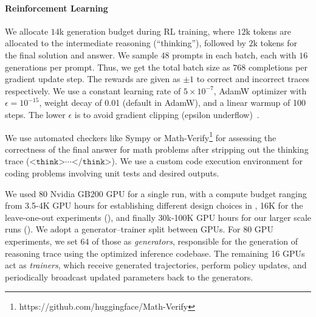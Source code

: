 \documentclass[]{fairmeta} %
\begin{document}
\paragraph{Reinforcement Learning}
We allocate $14$k generation budget during RL training, where $12\text{k}$ tokens are allocated to the intermediate reasoning (``thinking''), followed by $2\text{k}$ tokens for the final solution and answer. We sample $48$ prompts in each batch, each with $16$ generations per prompt. Thus, we get the total batch size as $768$ completions per gradient update step. The rewards are given as $\pm 1$ to correct and incorrect traces respectively. We use a constant learning rate of $5 \times 10^{-7}$, AdamW optimizer \citep{adamw} with $\epsilon = 10^{-15}$, weight decay of 0.01 (default in AdamW), and a linear warmup of 100 steps. The lower $\epsilon$ is to avoid gradient clipping (epsilon underflow)~\citep{wortsman2023stable}.

We use automated checkers like Sympy \citep{meurer2017sympy} or Math-Verify\footnote{https://github.com/huggingface/Math-Verify} for assessing the correctness of the final answer for math problems after stripping out the thinking trace ($\texttt{<think>}\cdots\texttt{</think>}$). We use a custom code execution environment for coding problems involving unit tests and desired outputs.

We used 80 Nvidia GB200 GPU for a single run, with a compute budget ranging from 3.5-4K GPU hours for establishing different design choices in , 16K for the leave-one-out experiments (), and finally 30k-100K GPU hours for our larger scale runs (). We adopt a generator–trainer split between GPUs. For 80 GPU experiments, we set $64$ of those as \emph{generators}, responsible for the generation of reasoning trace using the optimized inference codebase. The remaining 16 GPUs act as \emph{trainers}, which receive generated trajectories, perform policy updates, and periodically broadcast updated parameters back to the generators.
\end{document}
